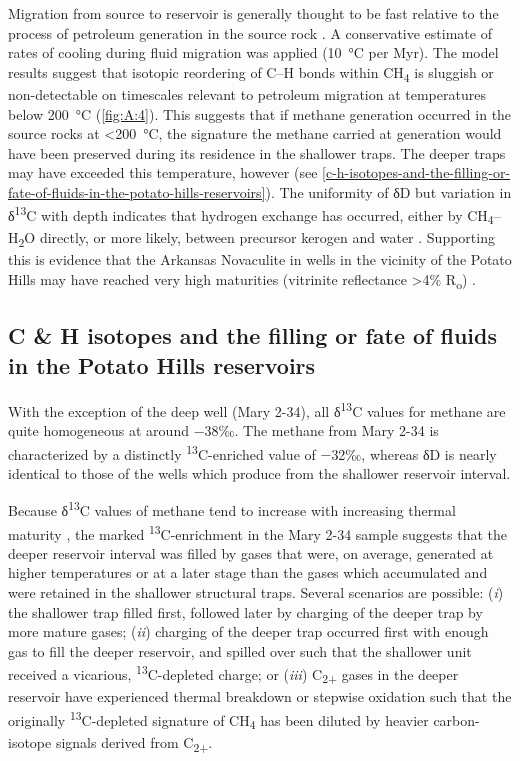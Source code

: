 

Migration from source to reservoir is generally thought to be fast
relative to the process of petroleum generation in the source rock
\parencite{England++_1991_AAPG-SV}. A conservative estimate of rates of cooling
during fluid migration was applied (10~°C per Myr). The model results
suggest that isotopic reordering of C--H bonds within
CH\textsubscript{4} is sluggish or non-detectable on timescales relevant
to petroleum migration at temperatures below 200~°C (\autoref{fig:A:4}). This
suggests that if methane generation occurred in the source rocks at
\textless{}200~°C, the signature the methane carried at generation would
have been preserved during its residence in the shallower traps. The
deeper traps may have exceeded this temperature, however (see \autoref{c-h-isotopes-and-the-filling-or-fate-of-fluids-in-the-potato-hills-reservoirs}).
The uniformity of δD but variation in δ\textsuperscript{13}C with depth
indicates that hydrogen exchange has occurred, either by
CH\textsubscript{4}--H\textsubscript{2}O directly, or more likely,
between precursor kerogen and water \parencite{Clayton_2003_IMOG}. Supporting this is
evidence that the Arkansas Novaculite in wells in the vicinity of the
Potato Hills may have reached very high maturities (vitrinite
reflectance \textgreater{}4\% R\textsubscript{o}) \parencite{Guthrie++_1986_AAPGB}.

\subsection{C \& H isotopes and the filling or fate of fluids in the
	Potato Hills
	reservoirs}\label{c-h-isotopes-and-the-filling-or-fate-of-fluids-in-the-potato-hills-reservoirs}

With the exception of the deep well (Mary 2-34), all
δ\textsuperscript{13}C values for methane are quite homogeneous at
around $-$38‰. The methane from Mary 2-34 is characterized by a distinctly
\textsuperscript{13}C-enriched value of $-$32‰, whereas δD is nearly
identical to those of the wells which produce from the shallower
reservoir interval.

Because δ\textsuperscript{13}C values of methane tend to increase with
increasing thermal maturity \parencite{Hunt_1996}, the marked
\textsuperscript{13}C-enrichment in the Mary 2-34 sample suggests that
the deeper reservoir interval was filled by gases that were, on average,
generated at higher temperatures or at a later stage than the gases
which accumulated and were retained in the shallower structural traps.
Several scenarios are possible: (\emph{i}) the shallower trap filled
first, followed later by charging of the deeper trap by more mature
gases; (\emph{ii}) charging of the deeper trap occurred first with enough gas to
fill the deeper reservoir, and spilled over such that the shallower
unit received a vicarious, \textsuperscript{13}C-depleted charge; or 
(\emph{iii}) C\textsubscript{2+} gases in the deeper reservoir have
experienced thermal breakdown or stepwise oxidation such that the
originally \textsuperscript{13}C-depleted signature of
CH\textsubscript{4} has been diluted by heavier carbon-isotope signals
derived from C\textsubscript{2+}.

